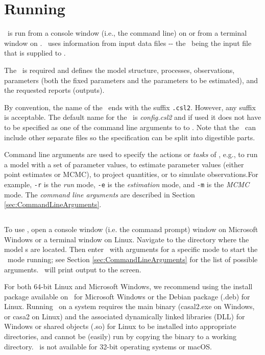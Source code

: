 \section{Running \CNAME\label{sec:RunningCasal2}}

\CNAME\ is run from a console window (i.e., the command line) on  or from a terminal window on . \CNAME\ uses information from input data files -{}- the \emph{\config{}}\ being the input file that is supplied to \CNAME.

The \config\ is required and defines the model structure, processes, observations, parameters (both the fixed parameters and the parameters to be estimated), and the requested reports (outputs).

By convention, the name of the \config\ ends with the suffix \texttt{.csl2}. However, any suffix is acceptable. The default name for the \config\ is \emph{config.csl2} and if used it does not have to be specified as one of the command line arguments to to \CNAME. Note that the \config\ can include other separate files so the specification can be split into digestible parts. 

Command line arguments are used to specify the actions or \emph{tasks} of \CNAME, e.g., to run a model with a set of parameter values, to estimate parameter values (either point estimates or MCMC), to project quantities, or to simulate observations.For example, \texttt{-r} is the \emph{run} mode, \texttt{-e} is the \emph{estimation} mode, and \texttt{-m} is the \emph{MCMC} mode. The \emph{command line arguments} are described in Section \ref{sec:CommandLineArguments}.

\subsection{}

To use \CNAME, open a console window (i.e. the command prompt) window on Microsoft Windows or a terminal window on Linux. Navigate to the directory where the model \config s are located. Then enter \CNAME\ with arguments for a specific mode to start the \CNAME\ mode running; see Section \ref{sec:CommandLineArguments} for the list of possible arguments. \CNAME\ will print output to the screen.

For both 64-bit Linux and Microsoft Windows, we recommend using the install package available on \github\ for Microsoft Windows or the Debian package (.deb) for Linux. Running \CNAME\ on a system requires the main binary (casal2.exe on Windows, or casa2 on Linux) and the associated dynamically linked libraries (DLL) for Windows or shared objects (.so) for Linux to be installed into appropriate directories, and cannot be (easily) run by copying the binary to a working directory. \CNAME\ is not available for 32-bit operating systems or macOS.

